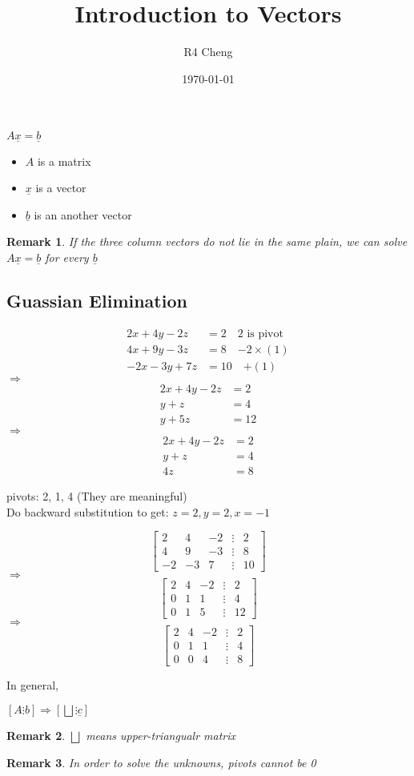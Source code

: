 \documentclass[12pt,a4paper]{article}
\title{Introduction to Vectors}
\author{R4 Cheng}
\date{\today}
\newtheorem*{rem}{Remark}
\newcommand{\remark}[1]{
  \begin{rem}
    \color{cyan}
    #1
  \end{rem}
}
\begin{document}
\maketitle

$ A \underline{x} = \underline{b} $

\begin{itemize}
  \item $A$ is a matrix
  \item $\underline{x}$ is a vector
  \item $\underline{b}$ is an another vector
\end{itemize}

\remark{If the three column vectors do not lie in the same plain, we can solve $A\underline{x}=\underline{b}$ for every $\underline{b}$}

\subsection*{Guassian Elimination}

\begin{align}
  2x + 4y - 2z &= 2 \quad \text{2 is pivot} \\
  4x + 9y - 3z &= 8 \quad \text{$-2 \times (1)$} \\
  -2x - 3y + 7z &= 10 \quad \text{$+ (1)$}
\end{align}
$\Rightarrow$
\begin{align}
  2x + 4y - 2z &= 2 \\
  y + z &= 4 \\
  y + 5z &= 12
\end{align}
$\Rightarrow$
\begin{align}
  2x + 4y - 2z &= 2 \\
  y + z &= 4 \\
  4z &= 8
\end{align}

pivots: 2, 1, 4 (They are meaningful) \\
Do backward substitution to get: $z = 2, y = 2, x = -1$

\[
\begin{bmatrix}
  \boxed{2} & 4 & -2 & \vdots & 2 \\
  4 & 9 & -3 & \vdots & 8 \\
  -2 & -3 & 7 & \vdots & 10
\end{bmatrix}
\]
$\Rightarrow$
\[
\begin{bmatrix}
  2 & 4 & -2 & \vdots & 2 \\
  0 & \boxed{1} & 1 & \vdots & 4 \\
  0 & 1 & 5 & \vdots & 12
\end{bmatrix}
\]
$\Rightarrow$
\[
\begin{bmatrix}
  2 & 4 & -2 & \vdots & 2 \\
  0 & 1 & 1 & \vdots & 4 \\
  0 & 0 & \boxed{4} & \vdots & 8
\end{bmatrix}
\]

In general,

$[A \vdots b] \Rightarrow [\bigsqcup \vdots \underline{c}]$

\remark{$\bigsqcup$ means upper-triangualr matrix}
\remark{In order to solve the unknowns, pivots cannot be 0}
\end{document}
